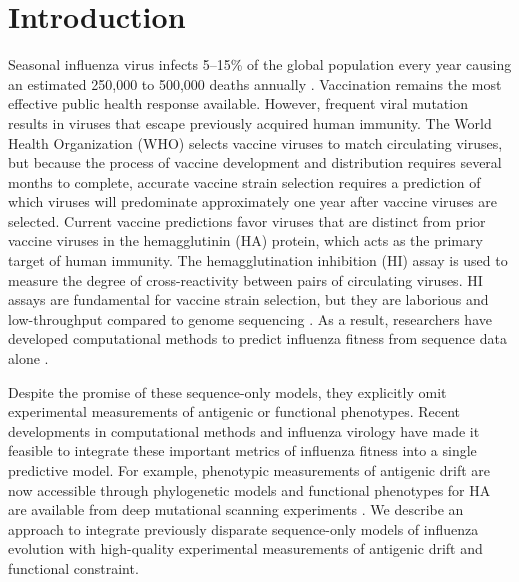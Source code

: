 
\section*{Introduction}

Seasonal influenza virus infects 5--15\% of the global population every year causing an estimated 250,000 to 500,000 deaths annually \cite{flufactsheet}.
Vaccination remains the most effective public health response available.
However, frequent viral mutation results in viruses that escape previously acquired human immunity.
The World Health Organization (WHO) selects vaccine viruses to match circulating viruses, but because the process of vaccine development and distribution requires several months to complete, accurate vaccine strain selection requires a prediction of which viruses will predominate approximately one year after vaccine viruses are selected.
Current vaccine predictions favor viruses that are distinct from prior vaccine viruses in the hemagglutinin (HA) protein, which acts as the primary target of human immunity.
The hemagglutination inhibition (HI) assay \cite{hirst1943studies} is used to measure the degree of cross-reactivity between pairs of circulating viruses.
HI assays are fundamental for vaccine strain selection, but they are laborious and low-throughput compared to genome sequencing \cite{Wood:2012ii}.
As a result, researchers have developed computational methods to predict influenza fitness from sequence data alone \cite{Luksza:2014hj,Steinbruck:2014kq,Neher:2014eu}.

Despite the promise of these sequence-only models, they explicitly omit experimental measurements of antigenic or functional phenotypes.
Recent developments in computational methods and influenza virology have made it feasible to integrate these important metrics of influenza fitness into a single predictive model.
For example, phenotypic measurements of antigenic drift are now accessible through phylogenetic models \cite{Neher:2016hy} and functional phenotypes for HA are available from deep mutational scanning experiments \cite{Lee2018}.
We describe an approach to integrate previously disparate sequence-only models of influenza evolution with high-quality experimental measurements of antigenic drift and functional constraint.

